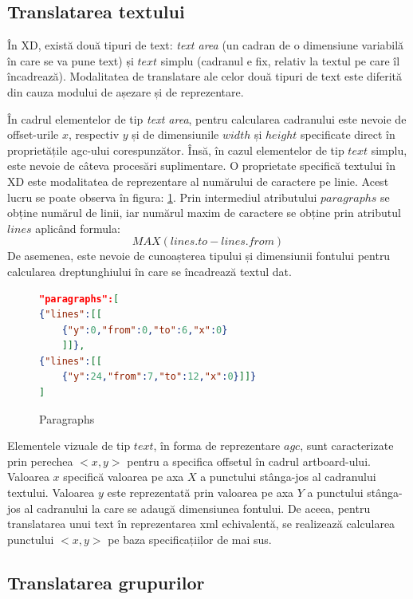 \subsection{Translatarea textului}

În XD, există două tipuri de text: \textit{text area} (un cadran de o dimensiune variabilă în care se va pune text) și $text$ simplu (cadranul e fix, relativ la textul pe care îl încadrează). Modalitatea de translatare ale celor două tipuri de text este diferită din cauza modului de așezare și de reprezentare. 

În cadrul elementelor de tip \textit{text area}, pentru calcularea cadranului este nevoie de offset-urile $x$, respectiv $y$ și de dimensiunile $width$ și $height$ specificate direct în proprietățile agc-ului corespunzător. Însă, în cazul elementelor de tip $text$ simplu, este nevoie de câteva procesări suplimentare.
O proprietate specifică textului în XD este modalitatea de reprezentare al numărului de caractere pe linie. Acest lucru se poate observa în figura: \ref{fig:Paragraphs}. Prin intermediul atributului $paragraphs$ se obține numărul de linii, iar numărul maxim de caractere se obține prin atributul $lines$ aplicând formula:  \[MAX(lines.to - lines.from)\] De asemenea, este nevoie de cunoașterea tipului și dimensiunii fontului pentru calcularea dreptunghiului în care se încadrează textul dat.

\begin{figure}[!htbp]
\begin{lstlisting}[language=json,firstnumber=1]
"paragraphs":[
{"lines":[[
    {"y":0,"from":0,"to":6,"x":0}
    ]]},
{"lines":[[
    {"y":24,"from":7,"to":12,"x":0}]]}
]
\end{lstlisting}
\caption{Paragraphs} \label{fig:Paragraphs}
\end{figure}

Elementele vizuale de tip $text$, în forma de reprezentare $agc$, sunt caracterizate prin perechea $<x, y>$ pentru a specifica offsetul în cadrul artboard-ului. Valoarea $x$ specifică valoarea pe axa $X$ a punctului stânga-jos al cadranului textului. Valoarea $y$ este reprezentată prin valoarea pe axa $Y$ a punctului stânga-jos al cadranului la care se adaugă dimensiunea fontului. De aceea, pentru translatarea unui text în reprezentarea xml echivalentă, se realizează calcularea punctului $<x, y>$ pe baza specificațiilor de mai sus.

\subsection{Translatarea grupurilor}

